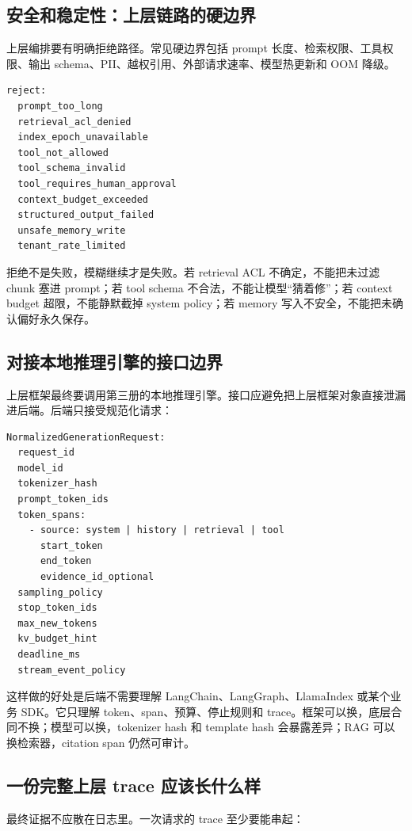 \subsection{安全和稳定性：上层链路的硬边界}

上层编排要有明确拒绝路径。常见硬边界包括 prompt 长度、检索权限、工具权限、输出 schema、PII、越权引用、外部请求速率、模型热更新和 OOM 降级。

\begin{lstlisting}[numbers=none,caption={上层请求拒绝原因}]
reject:
  prompt_too_long
  retrieval_acl_denied
  index_epoch_unavailable
  tool_not_allowed
  tool_schema_invalid
  tool_requires_human_approval
  context_budget_exceeded
  structured_output_failed
  unsafe_memory_write
  tenant_rate_limited
\end{lstlisting}

拒绝不是失败，模糊继续才是失败。若 retrieval ACL 不确定，不能把未过滤 chunk 塞进 prompt；若 tool schema 不合法，不能让模型“猜着修”；若 context budget 超限，不能静默截掉 system policy；若 memory 写入不安全，不能把未确认偏好永久保存。

\subsection{对接本地推理引擎的接口边界}

上层框架最终要调用第三册的本地推理引擎。接口应避免把上层框架对象直接泄漏进后端。后端只接受规范化请求：

\begin{lstlisting}[numbers=none,caption={NormalizedGenerationRequest}]
NormalizedGenerationRequest:
  request_id
  model_id
  tokenizer_hash
  prompt_token_ids
  token_spans:
    - source: system | history | retrieval | tool
      start_token
      end_token
      evidence_id_optional
  sampling_policy
  stop_token_ids
  max_new_tokens
  kv_budget_hint
  deadline_ms
  stream_event_policy
\end{lstlisting}

这样做的好处是后端不需要理解 LangChain、LangGraph、LlamaIndex 或某个业务 SDK。它只理解 token、span、预算、停止规则和 trace。框架可以换，底层合同不换；模型可以换，tokenizer hash 和 template hash 会暴露差异；RAG 可以换检索器，citation span 仍然可审计。

\subsection{一份完整上层 trace 应该长什么样}

最终证据不应散在日志里。一次请求的 trace 至少要能串起：

